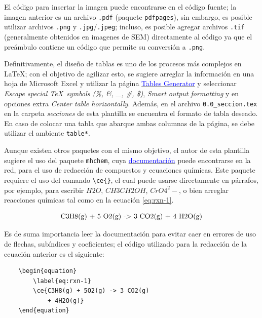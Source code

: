 \documentclass[fleqn,10pt]{SelfArx} %
\begin{document}
El código para insertar la imagen puede encontrarse en el código fuente; la imagen anterior es un archivo \texttt{.pdf} (paquete \texttt{pdfpages}), sin embargo, es posible utilizar archivos \texttt{.png} y \texttt{.jpg}/\texttt{.jpeg}; incluso, es posible agregar archivos \texttt{.tif} (generalmente obtenidos en imagenes de SEM) directamente al código ya que el preámbulo contiene un código que permite su conversión a \texttt{.png}.

Definitivamente, el diseño de tablas es uno de los procesos más complejos en \LaTeX; con el objetivo de agilizar esto, se sugiere arreglar la información en una hoja de Microsoft Excel y utilizar la página \href{https://www.tablesgenerator.com/}{\textcolor{blue}{Tables Generator}} y seleccionar \textit{Escape special \TeX~symbols (\%, \&, \_, \#, \$)}, \textit{Smart output formatting} y en opciones extra \textit{Center table horizontally}. Además, en el archivo \texttt{0.0\_seccion.tex} en la carpeta \textit{secciones} de esta plantilla se encuentra el formato de tabla deseado. En caso de colocar una tabla que abarque ambas columnas de la página, se debe utilizar el ambiente \texttt{table*}.

Aunque existen otros paquetes con el mismo objetivo, el autor de esta plantilla sugiere el uso del paquete \texttt{mhchem}, cuya \href{https://mirrors.rit.edu/CTAN/macros/latex/contrib/mhchem/mhchem.pdf}{\textcolor{blue}{documentación}} puede encontrarse en la red, para el uso de redacción de compuestos y ecuaciones químicas. Este paquete requiere el uso del comando \verb|\ce{}|, el cual puede usarse directamente en párrafos, por ejemplo, para escribir $H2O$, $CH3CH2OH$, $CrO4^2-$, o bien arreglar reacciones químicas tal como en la ecuación \eqref{eq:rxn-1}.

\begin{equation}
    \label{eq:rxn-1}
    $C3H8(g) + 5 O2(g) -> 3 CO2(g) + 4 H2O(g)$
\end{equation}

\noindent Es de suma importancia leer la documentación para evitar caer en errores de uso de flechas, subíndices y coeficientes; el código utilizado para la redacción de la ecuación anterior es el siguiente:

\begin{verbatim}
    \begin{equation}
        \label{eq:rxn-1}
        \ce{C3H8(g) + 5O2(g) -> 3 CO2(g) 
            + 4H2O(g)}
    \end{equation}
\end{verbatim}
\end{document}
